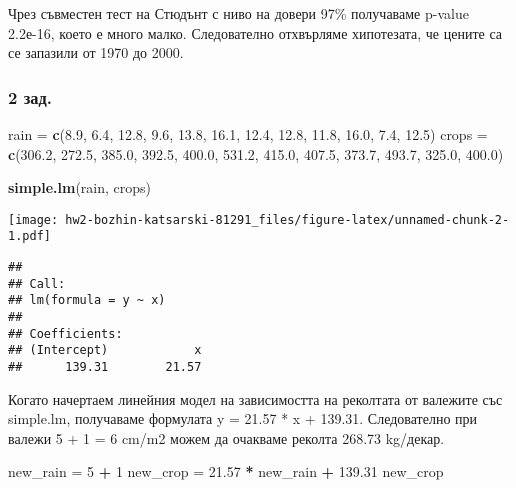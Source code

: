 \documentclass[]{article}
\newenvironment{Shaded}{\begin{snugshade}}{\end{snugshade}}
\newcommand{\KeywordTok}[1]{\textcolor[rgb]{0.13,0.29,0.53}{\textbf{#1}}}
\newcommand{\DecValTok}[1]{\textcolor[rgb]{0.00,0.00,0.81}{#1}}
\newcommand{\FloatTok}[1]{\textcolor[rgb]{0.00,0.00,0.81}{#1}}
\newcommand{\StringTok}[1]{\textcolor[rgb]{0.31,0.60,0.02}{#1}}
\newcommand{\OperatorTok}[1]{\textcolor[rgb]{0.81,0.36,0.00}{\textbf{#1}}}
\newcommand{\NormalTok}[1]{#1}
\begin{document}
Чрез съвместен тест на Стюдънт с ниво на довери 97\% получаваме p-value
2.2е-16, което е много малко. Следователно отхвърляме хипотезата, че
цените са се запазили от 1970 до 2000.

\subsubsection{2 зад.}\label{.-1}

\begin{Shaded}
\begin{Highlighting}[]
\NormalTok{rain =}\StringTok{ }\KeywordTok{c}\NormalTok{(}\FloatTok{8.9}\NormalTok{, }\FloatTok{6.4}\NormalTok{, }\FloatTok{12.8}\NormalTok{, }\FloatTok{9.6}\NormalTok{, }\FloatTok{13.8}\NormalTok{, }\FloatTok{16.1}\NormalTok{, }\FloatTok{12.4}\NormalTok{, }\FloatTok{12.8}\NormalTok{, }\FloatTok{11.8}\NormalTok{, }\FloatTok{16.0}\NormalTok{, }\FloatTok{7.4}\NormalTok{, }\FloatTok{12.5}\NormalTok{)}
\NormalTok{crops =}\StringTok{ }\KeywordTok{c}\NormalTok{(}\FloatTok{306.2}\NormalTok{, }\FloatTok{272.5}\NormalTok{, }\FloatTok{385.0}\NormalTok{, }\FloatTok{392.5}\NormalTok{, }\FloatTok{400.0}\NormalTok{, }\FloatTok{531.2}\NormalTok{, }\FloatTok{415.0}\NormalTok{, }\FloatTok{407.5}\NormalTok{, }\FloatTok{373.7}\NormalTok{, }\FloatTok{493.7}\NormalTok{, }\FloatTok{325.0}\NormalTok{, }\FloatTok{400.0}\NormalTok{)}

\KeywordTok{simple.lm}\NormalTok{(rain, crops)}
\end{Highlighting}
\end{Shaded}

\texttt{[image: hw2-bozhin-katsarski-81291\_files/figure-latex/unnamed-chunk-2-1.pdf]}

\begin{verbatim}
## 
## Call:
## lm(formula = y ~ x)
## 
## Coefficients:
## (Intercept)            x  
##      139.31        21.57
\end{verbatim}

Когато начертаем линейния модел на зависимостта на реколтата от валежите
със simple.lm, получаваме формулата y = 21.57 * x + 139.31. Следователно
при валежи 5 + 1 = 6 cm/m2 можем да очакваме реколта 268.73 kg/декар.

\begin{Shaded}
\begin{Highlighting}[]
\NormalTok{new_rain =}\StringTok{ }\DecValTok{5} \OperatorTok{+}\StringTok{ }\DecValTok{1}
\NormalTok{new_crop =}\StringTok{ }\FloatTok{21.57} \OperatorTok{*}\StringTok{ }\NormalTok{new_rain }\OperatorTok{+}\StringTok{ }\FloatTok{139.31}
\NormalTok{new_crop}
\end{Highlighting}
\end{Shaded}
\end{document}
